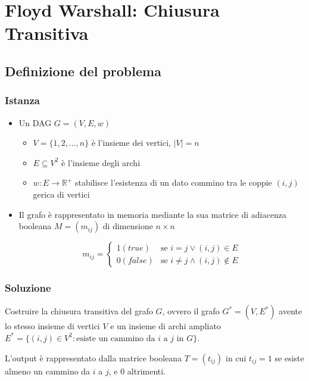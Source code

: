 \chapter{Floyd Warshall: Chiusura Transitiva}

\section{Definizione del problema}

\subsection{Istanza}
\begin{itemize}
    \item Un DAG $G=(V,E,w)$
    \begin{itemize}
        \item $V=\{1,2,\dots,n\}$ è l'insieme dei vertici, $|V|=n$
        \item $E \subseteq V^2$ è l'insieme degli archi
        \item $w:E \to \mathbb{R}^+$ stabilisce l'esistenza di un dato commino tra le coppie $(i,j)$ gerica di vertici
    \end{itemize}
    \item Il grafo è rappresentato in memoria mediante la sua matrice di adiacenza booleana $M=(m_{ij})$ di dimensione $n \times n$
    {
        \large

            $$
                m_{ij} = 
                \begin{cases}
                    1 (true) & \text{se } i=j \lor (i,j) \in E \\
                    0 (false) & \text{se } i \not = j \land (i,j) \not \in E
                \end{cases}
            $$
    }
\end{itemize}

\subsection{Soluzione}
Costruire la chiusura transitiva del grafo $G$, ovvero il grafo $G^* = (V,E^*)$ avente lo stesso insieme di vertici $V$ e un insieme di archi ampliato $E^* = \{(i,j) \in V^2 : \text{esiste un cammino da $i$ a $j$ in $G$}\}$.

L'output è rappresentato dalla matrice booleana $T=(t_{ij})$ in cui $t_{ij} = 1$ se esiste almeno un cammino da $i$ a $j$, e $0$ altrimenti.



